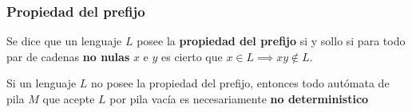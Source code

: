 \subsubsection{Propiedad del prefijo}
Se dice que un lenguaje \(L\) posee la \textbf{propiedad del prefijo} si y sollo si para todo par de cadenas \textbf{no nulas} \(x\) e \(y\) es cierto que \(x \in L \implies xy\notin L\).

Si un lenguaje \(L\) no posee la propiedad del prefijo, entonces todo autómata de pila \(M\) que acepte \(L\) por pila vacía es necesariamente \textbf{no deterministico}